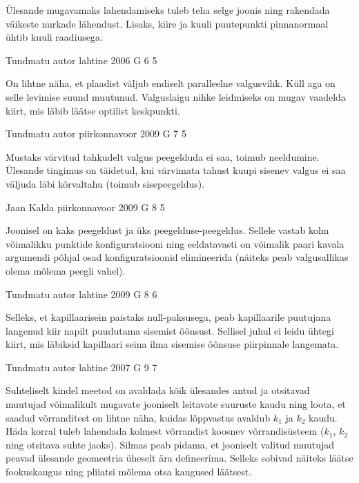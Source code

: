\documentclass[11pt]{article}
\begin{document}
{{\ifHint
Ülesande mugavamaks lahendamiseks tuleb teha selge joonis ning rakendada väikeste nurkade lähendust. Lisaks, kiire ja kuuli puutepunkti pinnanormaal ühtib kuuli raadiusega.
\fi
}

{Tundmatu autor} %
{lahtine} %
{2006} %
{G 6} %
{5} %
{

\ifHint
On lihtne näha, et plaadist väljub endiselt paralleelne valgusvihk. Küll aga on selle levimise suund muutunud. Valguslaigu nihke leidmiseks on mugav vaadelda kiirt, mis läbib läätse optilist keskpunkti.
\fi
}

{Tundmatu autor} %
{piirkonnavoor} %
{2009} %
{G 7} %
{5} %
{

\ifHint
Mustaks värvitud tahkudelt valgus peegelduda ei saa, toimub neeldumine. Ülesande tingimus on täidetud, kui värvimata tahust kuupi sisenev valgus ei saa
väljuda läbi kõrvaltahu (toimub sisepeegeldus).
\fi
}

{Jaan Kalda} %
{piirkonnavoor} %
{2009} %
{G 8} %
{5} %
{

\ifHint
Joonisel on kaks peegeldust ja üks peegelduse-peegeldus. Sellele vastab kolm võimalikku punktide konfiguratsiooni ning eeldatavasti on võimalik paari kavala argumendi põhjal osad konfiguratsioonid elimineerida (näiteks peab valgusallikas olema mõlema peegli vahel).
\fi
}

{Tundmatu autor} %
{lahtine} %
{2009} %
{G 8} %
{6} %
{

\ifHint
Selleks, et kapillaarisein paistaks null-paksusega, peab kapillaarile puutujana langenud kiir napilt puudutama sisemist õõnsust. Sellisel juhul ei leidu ühtegi kiirt, mis läbiksid kapillaari seina ilma sisemise õõnsuse piirpinnale langemata.
\fi
}

{Tundmatu autor} %
{lahtine} %
{2007} %
{G 9} %
{7} %
{

\ifHint
Suhteliselt kindel meetod on avaldada kõik ülesandes antud ja otsitavad muutujad võimalikult mugavate jooniselt leitavate suuruste kaudu ning loota, et saadud võrranditest on lihtne näha, kuidas lõppvastus avaldub $k_1$ ja $k_2$ kaudu. Häda korral tuleb lahendada kolmest võrrandist koosnev võrrandisüsteem ($k_1$, $k_2$ ning otsitava suhte jaoks). Silmas peab pidama, et jooniselt valitud muutujad peavad ülesande geomeetria üheselt ära defineerima. Selleks sobivad näiteks läätse fookuskaugus ning pliiatsi mõlema otsa kaugused läätsest.
\fi
}

}
\end{document}
